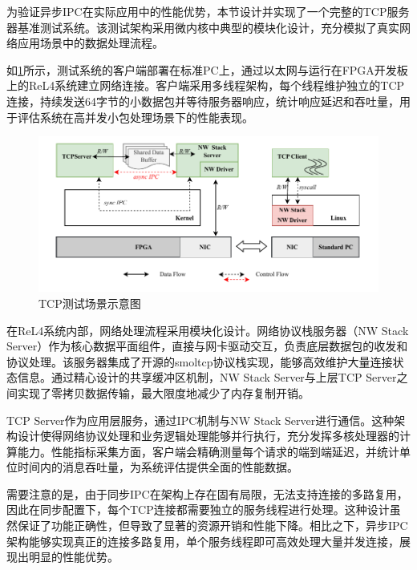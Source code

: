 为验证异步IPC在实际应用中的性能优势，本节设计并实现了一个完整的TCP服务器基准测试系统。该测试架构采用微内核中典型的模块化设计，充分模拟了真实网络应用场景中的数据处理流程。

如\ref{fig:tcp_test}所示，测试系统的客户端部署在标准PC上，通过以太网与运行在FPGA开发板上的ReL4系统建立网络连接。客户端采用多线程架构，每个线程维护独立的TCP连接，持续发送64字节的小数据包并等待服务器响应，统计响应延迟和吞吐量，用于评估系统在高并发小包处理场景下的性能表现。

\begin{figure}[htbp]
    \centering
    \includegraphics[width=1.0\textwidth]{figures/tcp_test_framework.drawio.pdf}
    \caption{TCP测试场景示意图}\label{fig:tcp_test}
\end{figure}

在ReL4系统内部，网络处理流程采用模块化设计。网络协议栈服务器（NW Stack Server）作为核心数据平面组件，直接与网卡驱动交互，负责底层数据包的收发和协议处理。该服务器集成了开源的smoltcp协议栈实现，能够高效维护大量连接状态信息。通过精心设计的共享缓冲区机制，NW Stack Server与上层TCP Server之间实现了零拷贝数据传输，最大限度地减少了内存复制开销。

TCP Server作为应用层服务，通过IPC机制与NW Stack Server进行通信。这种架构设计使得网络协议处理和业务逻辑处理能够并行执行，充分发挥多核处理器的计算能力。性能指标采集方面，客户端会精确测量每个请求的端到端延迟，并统计单位时间内的消息吞吐量，为系统评估提供全面的性能数据。

需要注意的是，由于同步IPC在架构上存在固有局限，无法支持连接的多路复用，因此在同步配置下，每个TCP连接都需要独立的服务线程进行处理。这种设计虽然保证了功能正确性，但导致了显著的资源开销和性能下降。相比之下，异步IPC架构能够实现真正的连接多路复用，单个服务线程即可高效处理大量并发连接，展现出明显的性能优势。

